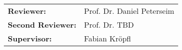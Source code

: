 {
	\vspace*{19.5cm}
	
	\Large{
	\def\arraystretch{1.2}
	\begin{tabular}{l l}
	
		\textbf{Reviewer:} & Prof. Dr. Daniel Peterseim \\
		\textbf{Second Reviewer:} & Prof. Dr. TBD \\
		\textbf{Supervisor:} & Fabian Kröpfl
	\end{tabular}
	}\par
	
	\def\arraystretch{1}
}
\restoregeometry
\pagebreak
